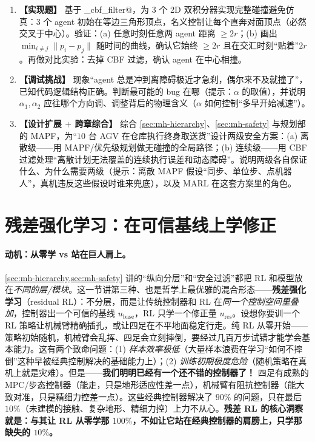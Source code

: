 \begin{practice}
\begin{enumerate}
  \item \textbf{【实现题】} 基于 \verb@pairwise_cbf_filter@，为 $3$ 个 2D 双积分器实现完整碰撞避免仿真：$3$ 个 agent 初始在等边三角形顶点，名义控制让每个直奔对面顶点（必然交叉于中心）。验证：(a) 任意时刻任意两 agent 距离 $\ge2r$；(b) 画出 $\min_{i\ne j}\|p_i-p_j\|$ 随时间的曲线，确认它始终 $\ge2r$ 且在交汇时刻“贴着”$2r$。再做对比实验：去掉 CBF 过滤，确认 agent 在中心相撞。
  \item \textbf{【调试挑战】} 现象“agent 总是冲到离障碍极近才急刹，偶尔来不及就撞了”，已知代码逻辑结构正确。判断最可能的 bug 在哪（提示：$\alpha$ 的取值），并说明 $\alpha_1,\alpha_2$ 应往哪个方向调、调整背后的物理含义（$\alpha$ 如何控制“多早开始减速”）。
  \item \textbf{【设计扩展 $+$ 跨章综合】} 综合 \cref{sec:mh-hierarchy}、\cref{sec:mh-safety} 与规划部的 MAPF，为“$10$ 台 AGV 在仓库执行终身取送货”设计两级安全方案：(a) 离散级——用 MAPF/优先级规划做无碰撞的全局路径；(b) 连续级——用 CBF 过滤处理“离散计划无法覆盖的连续执行误差和动态障碍”。说明两级各自保证什么、为什么需要两级（提示：离散 MAPF 假设“同步、单位步、点机器人”，真机违反这些假设时谁来兜底），以及 MARL 在这套方案里的角色。
\end{enumerate}
\end{practice}

\section{残差强化学习：在可信基线上学修正}
\label{sec:mh-residual}

\paragraph{动机：从零学 vs 站在巨人肩上。}
\cref{sec:mh-hierarchy,sec:mh-safety} 讲的“纵向分层”和“安全过滤”都把 RL 和模型放在\emph{不同的层/模块}。这一节讲第三种、也是哲学上最优雅的混合形态——\textbf{残差强化学习}（residual RL）：不分层，而是让传统控制器和 RL 在\emph{同一个控制空间里叠加}，控制器出一个可信的基线 $u_{\text{base}}$，RL 只学一个修正量 $u_{\text{res}}$。设想你要训一个 RL 策略让机械臂精确插孔，或让四足在不平地面稳定行走。纯 RL 从零开始——策略初始随机，机械臂会乱挥、四足会立刻摔倒，要经过几百万步试错才能学会基本能力。这有两个致命问题：(1) \emph{样本效率极低}（大量样本浪费在学习“如何不摔倒”这种早被经典控制解决的基础能力上）；(2) \emph{训练初期极度危险}（随机策略在真机上就是灾难）。但是——\textbf{我们明明已经有一个还不错的控制器了！} 四足有成熟的 MPC/步态控制器（能走，只是地形适应性差一点），机械臂有阻抗控制器（能大致对准，只是精细力控差一点）。这些经典控制器解决了 $90\%$ 的问题，只在最后 $10\%$（未建模的接触、复杂地形、精细力控）上力不从心。\textbf{残差 RL 的核心洞察就是：与其让 RL 从零学那 $100\%$，不如让它站在经典控制器的肩膀上，只学那缺失的 $10\%$。}

